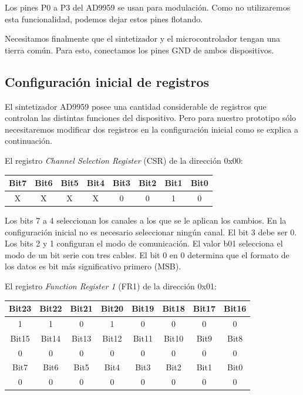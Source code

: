 \documentclass{article}
\newenvironment{standalone}{\begin{preview}}{\end{preview}}
\begin{document}
\begin{standalone}
  Los pines P0 a P3 del AD9959 se usan para modulación.
  Como no utilizaremos esta funcionalidad, podemos dejar estos pines flotando.

  Necesitamos finalmente que el sintetizador y el microcontrolador tengan una tierra común.
  Para esto, conectamos los pines GND de ambos dispositivos.

  \subsection{Configuración inicial de registros}

  El sintetizador AD9959 posee una cantidad considerable de registros que controlan las distintas funciones del dispositivo.
  Pero para nuestro prototipo sólo necesitaremos modificar dos registros en la configuración inicial como se explica a continuación.

  El registro \textit{Channel Selection Register} (CSR) de la dirección 0x00:
  \begin{table}[!htbp]
    \centering
    \begin{tabular}{|c|c|c|c|c|c|c|c|}
    \hline
    \rowcolor[HTML]{EFEFEF}
    Bit7 & Bit6 & Bit5 & Bit4 & Bit3 & Bit2 & Bit1 & Bit0 \\ \hline
    X    & X    & X    & X    & 0    & 0    & 1    & 0    \\ \hline
    \end{tabular}
  \end{table}

  Los bits 7 a 4 seleccionan los canales a los que se le aplican los cambios.
  En la configuración inicial no es necesario seleccionar ningún canal.
  El bit 3 debe ser 0.
  Los bits 2 y 1 configuran el modo de comunicación.
  El valor b01 selecciona el modo de un bit serie con tres cables.
  El bit 0 en 0 determina que el formato de los datos es bit más significativo primero (MSB).

  El registro \textit{Function Register 1} (FR1) de la dirección 0x01:
  \begin{table}[!htbp]
    \centering
    \begin{tabular}{|c|c|c|c|c|c|c|c|}
    \hline
    \rowcolor[HTML]{EFEFEF}
    Bit23 & Bit22 & Bit21 & Bit20 & Bit19 & Bit18 & Bit17 & Bit16 \\ \hline
    1     & 1     & 0     & 1     & 0     & 0     & 0     & 0     \\ \hline
    \rowcolor[HTML]{EFEFEF}
    Bit15 & Bit14 & Bit13 & Bit12 & Bit11 & Bit10 & Bit9  & Bit8  \\ \hline
    0     & 0     & 0     & 0     & 0     & 0     & 0     & 0     \\ \hline
    \rowcolor[HTML]{EFEFEF}
    Bit7  & Bit6  & Bit5  & Bit4  & Bit3  & Bit2  & Bit1  & Bit0  \\ \hline
    0     & 0     & 0     & 0     & 0     & 0     & 0     & 0     \\ \hline
    \end{tabular}
  \end{table}


\end{standalone}
\end{document}
